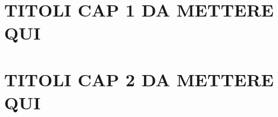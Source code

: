 \documentclass[a4paper,twoside]{book}
\begin{document}
     


\chapter{TITOLI CAP 1 DA METTERE QUI}


\chapter{TITOLI CAP 2 DA METTERE QUI}



\end{document}
